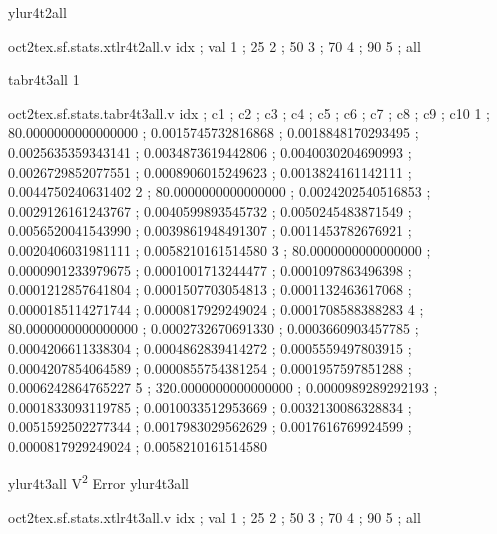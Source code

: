 \expandafter\def\csname oct2tex.sf.stats.xtlr4t2all.t\endcsname{ylur4t2all}
\begin{filecontents}[overwrite]{oct2tex.sf.stats.xtlr4t2all.v}
idx ; val
1 ; 25
2 ; 50
3 ; 70
4 ; 90
5 ; all
\end{filecontents}
\expandafter\def\csname oct2tex.sf.stats.tabr4t3all.t\endcsname{tabr4t3all}
\expandafter\def\csname oct2tex.sf.stats.tabr4t3all.u\endcsname{1}
\begin{filecontents}[overwrite]{oct2tex.sf.stats.tabr4t3all.v}
idx ; c1 ; c2 ; c3 ; c4 ; c5 ; c6 ; c7 ; c8 ; c9 ; c10
1 ; 80.0000000000000000 ; 0.0015745732816868 ; 0.0018848170293495 ; 0.0025635359343141 ; 0.0034873619442806 ; 0.0040030204690993 ; 0.0026729852077551 ; 0.0008906015249623 ; 0.0013824161142111 ; 0.0044750240631402
2 ; 80.0000000000000000 ; 0.0024202540516853 ; 0.0029126161243767 ; 0.0040599893545732 ; 0.0050245483871549 ; 0.0056520041543990 ; 0.0039861948491307 ; 0.0011453782676921 ; 0.0020406031981111 ; 0.0058210161514580
3 ; 80.0000000000000000 ; 0.0000901233979675 ; 0.0001001713244477 ; 0.0001097863496398 ; 0.0001212857641804 ; 0.0001507703054813 ; 0.0001132463617068 ; 0.0000185114271744 ; 0.0000817929249024 ; 0.0001708588388283
4 ; 80.0000000000000000 ; 0.0002732670691330 ; 0.0003660903457785 ; 0.0004206611338304 ; 0.0004862839414272 ; 0.0005559497803915 ; 0.0004207854064589 ; 0.0000855754381254 ; 0.0001957597851288 ; 0.0006242864765227
5 ; 320.0000000000000000 ; 0.0000989289292193 ; 0.0001833093119785 ; 0.0010033512953669 ; 0.0032130086328834 ; 0.0051592502277344 ; 0.0017983029562629 ; 0.0017616769924599 ; 0.0000817929249024 ; 0.0058210161514580
\end{filecontents}
\expandafter\def\csname oct2tex.sf.stats.ylur4t3all.t\endcsname{ylur4t3all}
\expandafter\def\csname oct2tex.sf.stats.ylur4t3all.u\endcsname{V\textsuperscript{2}}
\expandafter\def\csname oct2tex.sf.stats.ylur4t3all.v\endcsname{Error}
\expandafter\def\csname oct2tex.sf.stats.xtlr4t3all.t\endcsname{ylur4t3all}
\begin{filecontents}[overwrite]{oct2tex.sf.stats.xtlr4t3all.v}
idx ; val
1 ; 25
2 ; 50
3 ; 70
4 ; 90
5 ; all
\end{filecontents}
